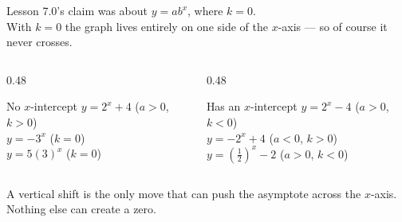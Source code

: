 \documentclass[aspectratio=169, 11pt]{beamer}
\begin{document}
\begin{frame}[t, plain]
  \begin{center}
    Lesson 7.0's claim was about $y=ab^{x}$, where $k=0$. \\[4pt]
    With $k=0$ the graph lives entirely on one side of the $x$-axis --- so of course it never crosses.
  \end{center}
  \vspace{8pt}
  \begin{columns}[T]
    \begin{column}{0.48\textwidth}
      \begin{block}{No $x$-intercept}
        $y=2^{x}+4$ \quad ($a>0$, $k>0$) \\[3pt]
        $y=-3^{x}$ \quad ($k=0$) \\[3pt]
        $y=5(3)^{x}$ \quad ($k=0$)
      \end{block}
    \end{column}
    \begin{column}{0.48\textwidth}
      \begin{block}{Has an $x$-intercept}
        $y=2^{x}-4$ \quad ($a>0$, $k<0$) \\[3pt]
        $y=-2^{x}+4$ \quad ($a<0$, $k>0$) \\[3pt]
        $y=\left(\frac12\right)^{x}-2$ \quad ($a>0$, $k<0$)
      \end{block}
    \end{column}
  \end{columns}
  \vspace{8pt}
  \begin{center}
    {\footnotesize A vertical shift is the only move that can push the asymptote across the $x$-axis.
    Nothing else can create a zero.}
  \end{center}
\end{frame}
\end{document}

